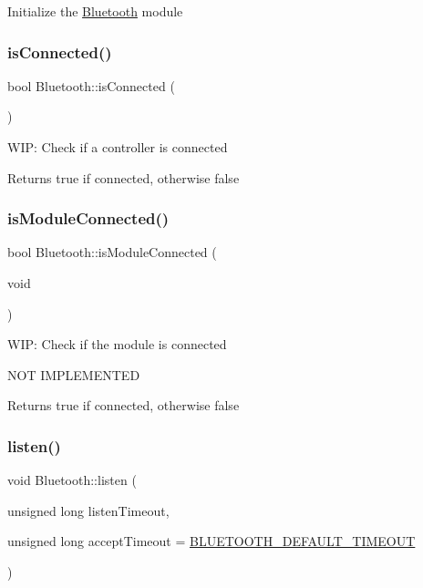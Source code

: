 Initialize the \mbox{\hyperlink{namespace_bluetooth}{Bluetooth}} module \mbox{\label{namespace_bluetooth_a339db81b59168385379a2d0872d1c1b8}} 
\subsubsection{\texorpdfstring{isConnected()}{isConnected()}}
{\footnotesize\ttfamily bool Bluetooth\+::is\+Connected (\begin{DoxyParamCaption}{ }\end{DoxyParamCaption})}

W\+IP\+: Check if a controller is connected

\begin{DoxyReturn}{Returns}
true if connected, otherwise false 
\end{DoxyReturn}
\mbox{\label{namespace_bluetooth_a3fe8dfbf207574a954a161112d2d5210}} 
\subsubsection{\texorpdfstring{isModuleConnected()}{isModuleConnected()}}
{\footnotesize\ttfamily bool Bluetooth\+::is\+Module\+Connected (\begin{DoxyParamCaption}\item[{void}]{ }\end{DoxyParamCaption})}

W\+IP\+: Check if the module is connected

N\+OT I\+M\+P\+L\+E\+M\+E\+N\+T\+ED

\begin{DoxyReturn}{Returns}
true if connected, otherwise false 
\end{DoxyReturn}
\mbox{\label{namespace_bluetooth_a4720c670f39b68ad09ab0426a586684e}} 
\subsubsection{\texorpdfstring{listen()}{listen()}}
{\footnotesize\ttfamily void Bluetooth\+::listen (\begin{DoxyParamCaption}\item[{unsigned long}]{listen\+Timeout,  }\item[{unsigned long}]{accept\+Timeout = {\ttfamily \mbox{\hyperlink{config_8h_a1abf7783a21bd29cabcbde11b37d9739}{B\+L\+U\+E\+T\+O\+O\+T\+H\+\_\+\+D\+E\+F\+A\+U\+L\+T\+\_\+\+T\+I\+M\+E\+O\+UT}}} }\end{DoxyParamCaption})}

